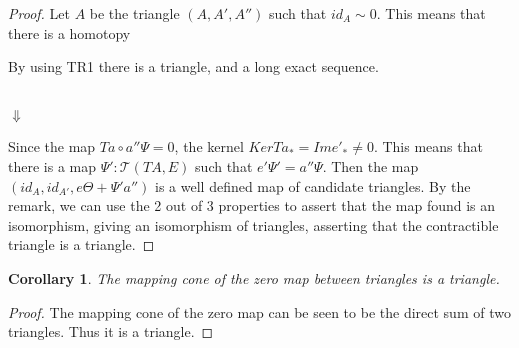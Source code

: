 \documentclass[12pt]{article}
\newtheorem{corollary}{Corollary}[theorem]
\theoremstyle{definition}
\theoremstyle{remark}
\begin{document}
            \begin{proof}
                Let $A$ be the triangle $(A,A',A'')$ such that $id_A \sim 0$. This means that there is a homotopy
                \begin{center}
                \end{center}
                By using TR1 there is a triangle, and a long exact sequence.
                \begin{center}
                     \\
                    $\Downarrow$ \\
                \end{center}
                Since the map $Ta\circ a''\Psi = 0$, the kernel $KerTa_*=Ime'_*\neq 0$. This means that there is a map ${\Psi}':\mathcal{T}(TA,E)$ such that $e'{\Psi}'=a''\Psi$. Then the map $(id_A,id_{A'},e\Theta+{\Psi}'a'')$ is a well defined map of candidate triangles. By the remark, we can use the 2 out of 3 properties to assert that the map found is an isomorphism, giving an isomorphism of triangles, asserting that the contractible triangle is a triangle. 
            \end{proof}

            \begin{corollary}
                The mapping cone of the zero map between  triangles is a triangle. 
            \end{corollary}

            \begin{proof}
                The mapping cone of the zero map can be seen to be the direct sum of two triangles. Thus it is a triangle.
            \end{proof}
\end{document}
